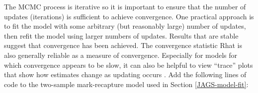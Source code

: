 \documentclass[
]{krantz}
\makeatletter
\newenvironment{Shaded}{\begin{snugshade}}{\end{snugshade}}
\newcommand{\AttributeTok}[1]{\textcolor[rgb]{0.27,0.27,0.27}{#1}}
\newcommand{\CommentTok}[1]{\textcolor[rgb]{0.37,0.37,0.37}{\textit{#1}}}
\newcommand{\DecValTok}[1]{\textcolor[rgb]{0.06,0.06,0.06}{#1}}
\newcommand{\FunctionTok}[1]{\textcolor[rgb]{0.27,0.27,0.27}{\textbf{#1}}}
\newcommand{\NormalTok}[1]{#1}
\newcommand{\OtherTok}[1]{\textcolor[rgb]{0.37,0.37,0.37}{#1}}
\newcommand{\SpecialCharTok}[1]{\textcolor[rgb]{0.43,0.43,0.43}{\textbf{#1}}}
\newcommand{\StringTok}[1]{\textcolor[rgb]{0.5,0.5,0.5}{#1}}
\newenvironment{kframe}{%
\medskip{}
\setlength{\fboxsep}{.8em}
 \def\at@end@of@kframe{}%
 \ifinner\ifhmode%
  \def\at@end@of@kframe{\end{minipage}}%
  \begin{minipage}{\columnwidth}%
 \fi\fi%
 \def\FrameCommand##1{\hskip\@totalleftmargin \hskip-\fboxsep
 \colorbox{shadecolor}{##1}\hskip-\fboxsep
     \hskip-\linewidth \hskip-\@totalleftmargin \hskip\columnwidth}%
 \MakeFramed {\advance\hsize-\width
   \@totalleftmargin\z@ \linewidth\hsize
   \@setminipage}}%
 {\par\unskip\endMakeFramed%
 \at@end@of@kframe}
\renewenvironment{Shaded}{\begin{kframe}}{\end{kframe}}
\makeatother
\begin{document}
The MCMC process is iterative so it is important to ensure that the number of updates (iterations) is sufficient to achieve convergence. One practical approach is to fit the model with some arbitrary (but reasonably large) number of updates, then refit the model using larger numbers of updates. Results that are stable suggest that convergence has been achieved. The convergence statistic Rhat \citep{gelman.rubin_1992, brooks.gelman_1998, lunn.etal_2012} is also generally reliable as a measure of convergence. Especially for models for which convergence appears to be slow, it can also be helpful to view ``trace'' plots that show how estimates change as updating occurs \citep{kéry_2010}. Add the following lines of code to the two-sample mark-recapture model used in Section \ref{JAGS-model-fit}:

\begin{Shaded}
\end{Shaded}
\end{document}
